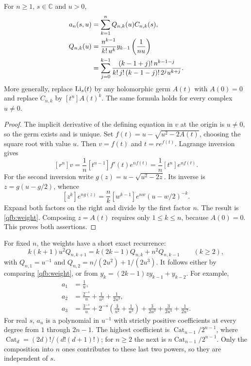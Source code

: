 \begin{theorem}\label{qfb:bessel-theorem}
For $n\ge1$, $s\in\mathbb C$ and $u>0$,
\begin{align}
 a_n(s,u)&=\sum_{k=1}^n Q_{n,k}(u)C_{n,k}(s),\label{qfb:finite}\\
 Q_{n,k}(u)&=\frac{n^{k-1}}{k!\,u^k}
                 y_{k-1}\left(\frac1{nu}\right)\notag\\
 &=\sum_{j=0}^{k-1}
 \frac{(k-1+j)!\,n^{k-1-j}}
 {k!\,j!\,(k-1-j)!\,2^j u^{k+j}}.\label{qfb:weight}
\end{align}
More generally, replace $\operatorname{Li}_s(t)$ by any holomorphic germ
$A(t)$ with $A(0)=0$ and replace $C_{n,k}$ by $[t^n]A(t)^k$.
The same formula holds for every complex $u\ne0$.
\end{theorem}
\begin{proof}
The implicit derivative of the defining equation in $v$ at the origin
is $u\ne0$, so the germ exists and is unique. Set
$f(t)=u-\sqrt{u^2-2A(t)}$, choosing the square root with value $u$.
Then $v=f(t)$ and $t=re^{f(t)}$. Lagrange inversion gives
\[
 [r^n]v=\frac1n[t^{n-1}]f'(t)e^{nf(t)}
       =\frac1n[t^n]e^{nf(t)}.
\]
For the second inversion write $g(z)=u-\sqrt{u^2-2z}$.
Its inverse is $z=g(u-g/2)$, whence
\[
 [z^k]e^{ng(z)}
 =\frac nk[w^{k-1}]e^{nw}(u-w/2)^{-k}.
\]
Expand both factors on the right and divide by the first factor $n$.
The result is \eqref{qfb:weight}. Composing $z=A(t)$ requires only
$1\le k\le n$, because $A(0)=0$. This proves both assertions.
\end{proof}

For fixed $n$, the weights have a short exact recurrence:
\begin{equation}\label{qfb:weight-recurrence}
 k(k+1)u^2Q_{n,k+1}
 =k(2k-1)Q_{n,k}+n^2Q_{n,k-1}\qquad(k\ge2),
\end{equation}
with $Q_{n,1}=u^{-1}$ and
$Q_{n,2}=n/(2u^2)+1/(2u^3)$. It follows either by comparing
\eqref{qfb:weight}, or from
$y_k=(2k-1)zy_{k-1}+y_{k-2}$.
For example,
\begin{align*}
 a_1&=\frac1u,\\
 a_2&=\frac{2^{-s}}u+\frac1{u^2}+\frac1{2u^3},\\
 a_3&=\frac{3^{-s}}u+
       2^{-s}\left(\frac3{u^2}+\frac1{u^3}\right)
       +\frac3{2u^3}+\frac3{2u^4}+\frac1{2u^5}.
\end{align*}
For real $s$, $a_n$ is a polynomial in $u^{-1}$ with strictly positive
coefficients at every degree from $1$ through $2n-1$. The highest
coefficient is $\operatorname{Cat}_{n-1}/2^{n-1}$, where
$\operatorname{Cat}_d=(2d)!/(d!(d+1)!)$; for $n\ge2$ the next is
$n\operatorname{Cat}_{n-1}/2^{n-1}$. Only the composition into $n$
ones contributes to these last two powers, so they are independent of $s$.

